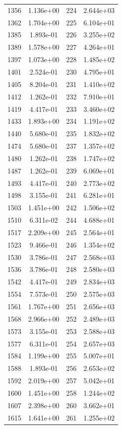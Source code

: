 \documentclass[12pt]{article}
\begin{document}
\begin{longtable}{@{}cccc@{}}
1356 & 1.136e+00 & 224 & 2.644e+03 \\
1362 & 1.704e+00 & 225 & 6.104e+01 \\
1385 & 1.893e-01 & 226 & 3.255e+02 \\
1389 & 1.578e+00 & 227 & 4.264e+01 \\
1397 & 1.073e+00 & 228 & 1.485e+02 \\
1401 & 2.524e-01 & 230 & 4.795e+01 \\
1405 & 8.204e-01 & 231 & 1.410e+02 \\
1412 & 1.262e-01 & 232 & 7.910e+01 \\
1419 & 4.417e-01 & 233 & 3.460e+02 \\
1433 & 1.893e+00 & 234 & 1.191e+02 \\
1440 & 5.680e-01 & 235 & 1.832e+02 \\
1474 & 5.680e-01 & 237 & 1.357e+02 \\
1480 & 1.262e-01 & 238 & 1.747e+02 \\
1487 & 1.262e-01 & 239 & 6.069e+01 \\
1493 & 4.417e-01 & 240 & 2.773e+02 \\
1498 & 3.155e-01 & 241 & 6.281e+01 \\
1503 & 1.451e+00 & 242 & 1.506e+02 \\
1510 & 6.311e-02 & 244 & 4.688e+01 \\
1517 & 2.209e+00 & 245 & 2.564e+01 \\
1523 & 9.466e-01 & 246 & 1.354e+02 \\
1530 & 3.786e-01 & 247 & 2.568e+03 \\
1536 & 3.786e-01 & 248 & 2.580e+03 \\
1542 & 4.417e-01 & 249 & 2.834e+03 \\
1554 & 7.573e-01 & 250 & 2.575e+03 \\
1561 & 1.767e+00 & 251 & 2.656e+03 \\
1568 & 2.966e+00 & 252 & 2.489e+03 \\
1573 & 3.155e-01 & 253 & 2.588e+03 \\
1577 & 6.311e-01 & 254 & 2.657e+03 \\
1584 & 1.199e+00 & 255 & 5.007e+01 \\
1588 & 1.893e-01 & 256 & 2.653e+02 \\
1592 & 2.019e+00 & 257 & 5.042e+01 \\
1600 & 1.451e+00 & 258 & 1.244e+02 \\
1607 & 2.398e+00 & 260 & 3.662e+01 \\
1615 & 1.641e+00 & 261 & 1.255e+02 \\

\end{longtable}
\end{document}
